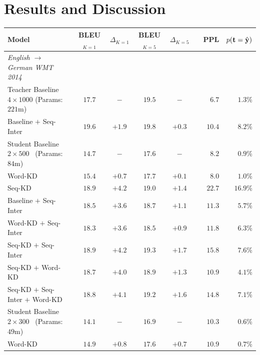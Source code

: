 \documentclass[11pt,letterpaper]{article}
\begin{document}
\section{Results and Discussion}\label{results}
\begin{table}[!ht] \label{de}
\centering
\small
\begin{tabular}{l c c  c c r r r }
\toprule
Model &    BLEU$_{K=1}$ & $\Delta_{K=1}$ & BLEU$_{K=5}$ & $\Delta_{K=5}$ & & PPL & $p(\mathbf{t} = \hat{\mathbf{y}})$ \\
\midrule
\textit{English $\rightarrow$ German WMT 2014} \\ 
\midrule
Teacher Baseline $4 \times 1000$  (Params: $221$m)  & $17.7$ &  $-$ & $19.5$&   $-$ & &  $6.7$ &  $1.3\%$ \\
\hspace{4mm} Baseline $+$  Seq-Inter  & $19.6$ & $+1.9$&  $19.8$& $+0.3$&  & $10.4$ & $8.2\%$   \\
\midrule
Student Baseline $2 \times 500$ $\,$ (Params: $84$m)  & $14.7$ & $-$ & $17.6$&  $-$ & & $8.2$ & $0.9\%$  \\
\hspace{4mm} Word-KD  & $15.4$ & $+0.7$& $17.7$& $+0.1$& & $8.0$ & $1.0\%$  \\
\hspace{4mm} Seq-KD   & $18.9$ & $+\mathbf{4.2}$& $19.0$& $+1.4$& & $22.7$ & $16.9\%$ \\
\hspace{4mm} Baseline $+$ Seq-Inter   & $18.5$ & $+3.6$& $18.7$& $+1.1$& & $11.3$ & $5.7\%$ \\
\hspace{4mm} Word-KD $+$ Seq-Inter  & $18.3$ & $+3.6$& $18.5$& $+0.9$& & $11.8$ & $6.3\%$ \\
\hspace{4mm} Seq-KD $+$ Seq-Inter  & $18.9$ & $+\mathbf{4.2}$&$19.3$ & $+\mathbf{1.7}$ & & $15.8$ & $7.6\%$  \\
\hspace{4mm} Seq-KD $+$ Word-KD  & $18.7$ & $+4.0$& $18.9$& $+1.3$& & $10.9$ & $4.1\%$  \\
\hspace{4mm} Seq-KD $+$ Seq-Inter $+$ Word-KD  & $18.8$ & $+4.1$& $19.2$& $+1.6$& & $14.8$ &$7.1\%$  \\
\midrule
Student Baseline $2 \times 300$ $\,$ (Params: $49$m) & $14.1$ & $-$ & $16.9$&  $-$ &  & $10.3$ & $0.6\%$ \\
\hspace{4mm}  Word-KD  & $14.9$ & $+0.8$& $17.6$& $+0.7$& & $10.9$ & $0.7\%$  \\

\end{tabular}
\end{table}
\end{document}
